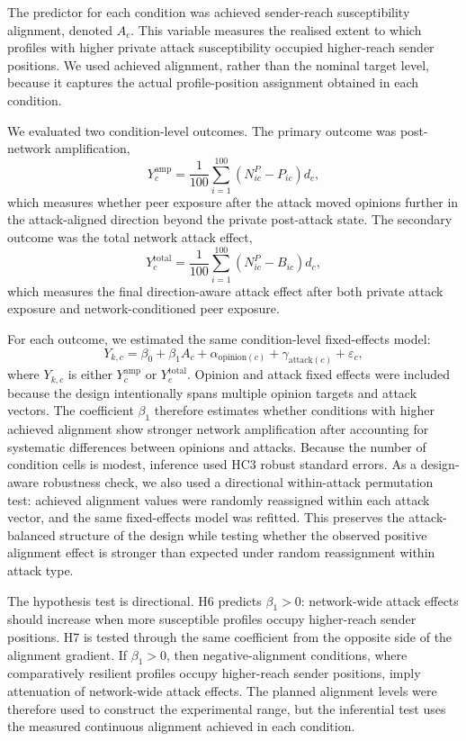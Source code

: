 \documentclass[11pt,a4paper]{article}
\begin{document}
The predictor for each condition was achieved sender-reach susceptibility alignment, denoted
\(A_c\). This variable measures the realised extent to which profiles with higher private attack
susceptibility occupied higher-reach sender positions. We used achieved alignment, rather than the
nominal target level, because it captures the actual profile-position assignment obtained in each
condition.

We evaluated two condition-level outcomes. The primary outcome was post-network amplification,
\begin{equation}
Y^{\mathrm{amp}}_c = \frac{1}{100}\sum_{i=1}^{100}(N^P_{ic}-P_{ic})d_c ,
\end{equation}
which measures whether peer exposure after the attack moved opinions further in the attack-aligned
direction beyond the private post-attack state. The secondary outcome was the total network attack
effect,
\begin{equation}
Y^{\mathrm{total}}_c = \frac{1}{100}\sum_{i=1}^{100}(N^P_{ic}-B_{ic})d_c ,
\end{equation}
which measures the final direction-aware attack effect after both private attack exposure and
network-conditioned peer exposure.

For each outcome, we estimated the same condition-level fixed-effects model:
\begin{equation}
Y_{k,c} = \beta_0 + \beta_1 A_c + \alpha_{\mathrm{opinion}(c)}
 + \gamma_{\mathrm{attack}(c)} + \varepsilon_c ,
\end{equation}
where \(Y_{k,c}\) is either \(Y^{\mathrm{amp}}_c\) or \(Y^{\mathrm{total}}_c\). Opinion and attack
fixed effects were included because the design intentionally spans multiple opinion targets and
attack vectors. The coefficient \(\beta_1\) therefore estimates whether conditions with higher
achieved alignment show stronger network amplification after accounting for systematic differences
between opinions and attacks. Because the number of condition cells is modest, inference used HC3
robust standard errors. As a design-aware robustness check, we also used a directional
within-attack permutation test: achieved alignment values were randomly reassigned within each
attack vector, and the same fixed-effects model was refitted. This preserves the attack-balanced
structure of the design while testing whether the observed positive alignment effect is stronger
than expected under random reassignment within attack type.

The hypothesis test is directional. H6 predicts \(\beta_1 > 0\): network-wide attack effects
should increase when more susceptible profiles occupy higher-reach sender positions. H7 is tested
through the same coefficient from the opposite side of the alignment gradient. If
\(\beta_1 > 0\), then negative-alignment conditions, where comparatively resilient profiles occupy
higher-reach sender positions, imply attenuation of network-wide attack effects. The planned
alignment levels were therefore used to construct the experimental range, but the inferential test
uses the measured continuous alignment achieved in each condition.
\end{document}
